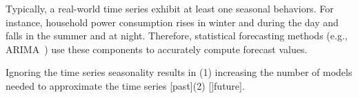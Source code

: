  
Typically, a real-world time series  exhibit at least one  seasonal behaviors. For instance, household power consumption rises in winter and during the day and falls in the summer and at night.
Therefore, statistical  forecasting methods (e.g., ARIMA~\cite{tBOX76a}) use these components  to accurately compute forecast values. 	






Ignoring the time series seasonality  results in (1) increasing the number of models needed to approximate the time series [past](2) []future]. 






   
 
 

